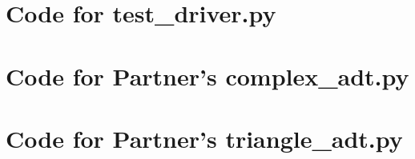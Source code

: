 \documentclass[12pt]{article}
\begin{document}
\noindent 

\newpage

\section{Code for test\_driver.py}

\noindent 

\newpage

\section{Code for Partner's complex\_adt.py}

\noindent 

\section{Code for Partner's triangle\_adt.py}

\noindent 
\end{document}
